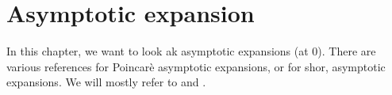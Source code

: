 \chapter{Asymptotic expansion}
\begin{comment}
  ´classical'
  \begin{itemize}
    \item \cite[60]{sabbah_cimpa90} Chapter II.2.2
      \begin{itemize}
        \item \cite{sabbah2000equations}
      \end{itemize}
    \item \textbf{\textcolor{blue}{Van der Put:
          \cite[Chapter 7]{van2003galois}: Exact Asymptotics}}
    \item \cite{majima1984asymptotic}
    \item \cite{Balser2000Formal}
    \item \cite{Loday1994}
    \item \textbf{\textcolor{blue}{\cite{Loday2014} Chapter 2}}
  \end{itemize}
  ´sheafical'
  \begin{itemize}
    \item \textbf{\textcolor{red}{\cite[II.5]{sabbah2007isomonodromic}}}
  \end{itemize}
  \TODO:
  \begin{itemize}
    \item \cite{sibuya1990Linear} Appendix A.3
  \end{itemize}
\end{comment}
In this chapter, we want to look ak asymptotic expansions (at $0$).
There are various references for Poincarè asymptotic expansions, or for shor,
asymptotic expansions.
We will mostly refer to \cite[chapter 2]{Loday2014} and
\cite[chapter 7]{van2003galois}.



